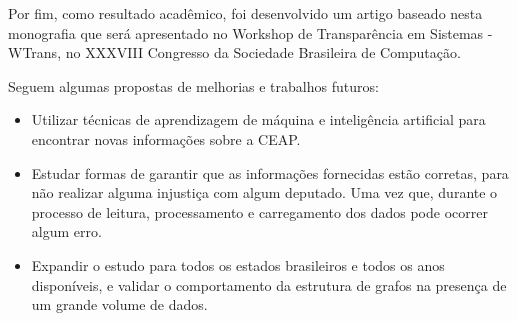 Por fim, como resultado acadêmico, foi desenvolvido um artigo baseado nesta monografia que será apresentado no Workshop de Transparência em Sistemas - WTrans, no XXXVIII Congresso da Sociedade Brasileira de Computação.

	Seguem algumas propostas de melhorias e trabalhos futuros:
	
	\begin{itemize}
		\item Utilizar técnicas de aprendizagem de máquina e inteligência artificial para encontrar novas informações sobre a CEAP.
		\item Estudar formas de garantir que as informações fornecidas estão corretas, para não realizar alguma injustiça com algum deputado. Uma vez que, durante o processo de leitura, processamento e carregamento dos dados pode ocorrer algum erro.
		\item Expandir o estudo para todos os estados brasileiros e todos os anos disponíveis, e validar o comportamento da estrutura de grafos na presença de um grande volume de dados.
	\end{itemize}